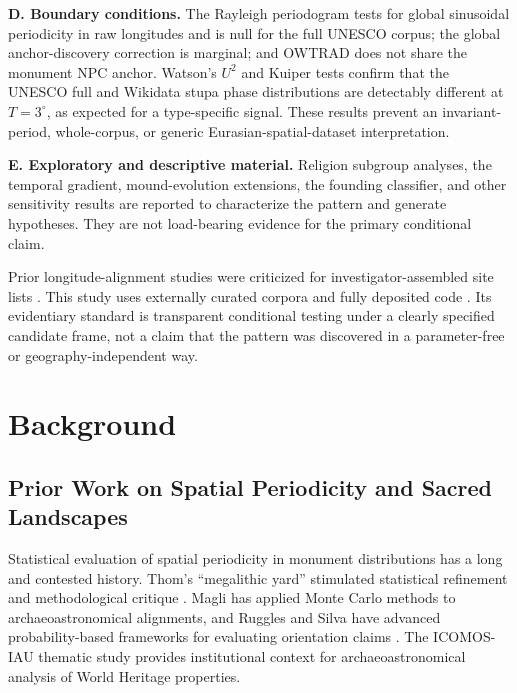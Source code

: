 \textbf{D. Boundary conditions.}
The Rayleigh periodogram tests for global sinusoidal periodicity in
raw longitudes and is null for the full UNESCO corpus; the global anchor-discovery correction is
marginal; and OWTRAD does not share the monument NPC anchor. Watson's
$U^2$ and Kuiper tests confirm that the UNESCO full and Wikidata stupa
phase distributions are detectably different at $T=3^\circ$, as
expected for a type-specific signal. These results prevent an
invariant-period, whole-corpus, or generic Eurasian-spatial-dataset
interpretation.

\textbf{E. Exploratory and descriptive material.}
Religion subgroup analyses, the temporal gradient, mound-evolution
extensions, the founding classifier, and other sensitivity results
are reported to characterize the pattern and generate hypotheses.
They are not load-bearing evidence for the primary conditional claim.

Prior longitude-alignment studies were criticized for
investigator-assembled site lists
\citep{williamson1983leylines,freeman1976,kendall1974}. This study
uses externally curated corpora and fully deposited code
\citep{tenenbaum2026audit}. Its evidentiary standard is transparent
conditional testing under a clearly specified candidate frame, not a
claim that the pattern was discovered in a parameter-free or
geography-independent way.

\section{Background}
\label{sec:prior}



\subsection{Prior Work on Spatial Periodicity and Sacred Landscapes}

Statistical evaluation of spatial periodicity in monument distributions has a
long and contested history.
Thom's ``megalithic yard'' \citep{thom1967,thom1971,thom1964}
stimulated statistical refinement \citep{kendall1974} and methodological
critique \citep{freeman1976}.
Magli \citep{magli2013,magli2016} has applied Monte Carlo methods to
archaeoastronomical alignments, and Ruggles and Silva have advanced
probability-based frameworks for evaluating orientation claims
\citep{ruggles1999astronomy,ruggles2015handbook,silva2020statistical}.
The ICOMOS-IAU thematic study \citep{ruggles2010icomos} provides
institutional context for archaeoastronomical analysis of World Heritage
properties.

